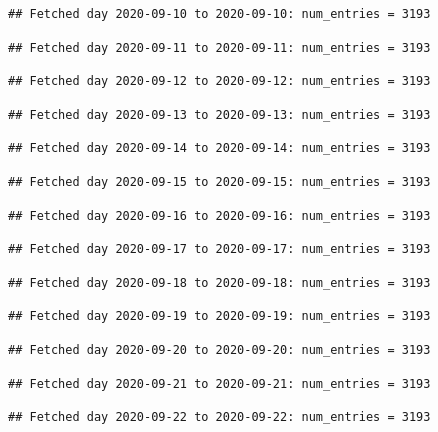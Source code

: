 \documentclass[]{article}
\begin{document}
\begin{verbatim}
## Fetched day 2020-09-10 to 2020-09-10: num_entries = 3193
\end{verbatim}

\begin{verbatim}
## Fetched day 2020-09-11 to 2020-09-11: num_entries = 3193
\end{verbatim}

\begin{verbatim}
## Fetched day 2020-09-12 to 2020-09-12: num_entries = 3193
\end{verbatim}

\begin{verbatim}
## Fetched day 2020-09-13 to 2020-09-13: num_entries = 3193
\end{verbatim}

\begin{verbatim}
## Fetched day 2020-09-14 to 2020-09-14: num_entries = 3193
\end{verbatim}

\begin{verbatim}
## Fetched day 2020-09-15 to 2020-09-15: num_entries = 3193
\end{verbatim}

\begin{verbatim}
## Fetched day 2020-09-16 to 2020-09-16: num_entries = 3193
\end{verbatim}

\begin{verbatim}
## Fetched day 2020-09-17 to 2020-09-17: num_entries = 3193
\end{verbatim}

\begin{verbatim}
## Fetched day 2020-09-18 to 2020-09-18: num_entries = 3193
\end{verbatim}

\begin{verbatim}
## Fetched day 2020-09-19 to 2020-09-19: num_entries = 3193
\end{verbatim}

\begin{verbatim}
## Fetched day 2020-09-20 to 2020-09-20: num_entries = 3193
\end{verbatim}

\begin{verbatim}
## Fetched day 2020-09-21 to 2020-09-21: num_entries = 3193
\end{verbatim}

\begin{verbatim}
## Fetched day 2020-09-22 to 2020-09-22: num_entries = 3193
\end{verbatim}
\end{document}

